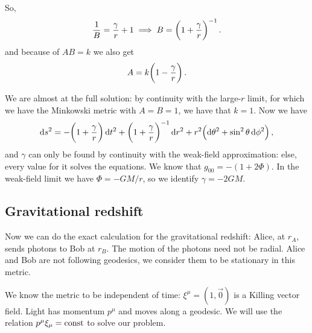\documentclass[main.tex]{subfiles}
\begin{document}
So, 
%
\begin{align}
  \frac{1}{B} = \frac{\gamma}{r} + 1 \implies B = \qty(1 + \frac{ \gamma }{r})^{-1}
\,.
\end{align}
%
and because of \(AB = k\) we also get 
%
\begin{align}
  A = k \qty(1 - \frac{\gamma}{r})
\,.
\end{align}

We are almost at the full solution: by continuity with the large-\(r\) limit, for which we have the Minkowski metric with \(A = B = 1\), we have that \(k=1\). Now we have 
%
\begin{align}
  \dd{s^2} = - \qty(1 + \frac{\gamma }{r}) \dd{t^2} 
  + \qty(1 + \frac{\gamma}{r})^{-1} \dd{r^2}
  + r^2 \qty(\dd{\theta^2} + \sin^2 \theta \dd{\phi^2})
\,,
\end{align}
%
and \(\gamma \) can only be found by continuity with the weak-field approximation: else, every value for it solves the equations. 
We know that \(g_{00} = - (1+2 \Phi )\).
In the weak-field limit we have \(\Phi = -GM/r\), so we identify \(\gamma = - 2GM\).

\subsection{Gravitational redshift}

Now we can do the exact calculation for the gravitational redshift:
Alice, at \(r_A\), sends photons to Bob at \(r_B\). The motion of the photons need not be radial.
Alice and Bob are not following geodesics, we consider them to be stationary in this metric.

We know the metric to be independent of time: \(\xi^{\mu } = (1,\vec{0})\) is a Killing vector field.
Light has momentum \(p^{\mu }\) and moves along a geodesic.
We will use the relation \(p^{\mu } \xi_{\mu } = \text{const}\) to solve our problem.
\end{document}

